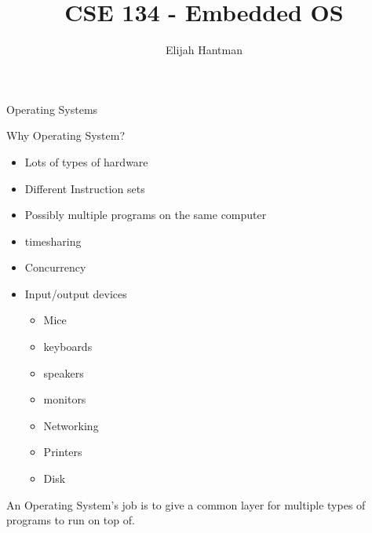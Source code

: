\documentclass{report}
\title{\Huge{CSE 134 - Embedded OS}}
\author{\huge{Elijah Hantman}}
\date{}
\begin{document}
\maketitle
\newpage

\large{Operating Systems}
\begin{description}
    \item Why Operating System? 
        \begin{mdframed}
            \begin{itemize}
                \item Lots of types of hardware
                \item Different Instruction sets
                \item Possibly multiple programs on the same computer
                \item timesharing
                \item Concurrency
                \item Input/output devices
                    \begin{itemize}
                        \item Mice
                        \item keyboards
                        \item speakers
                        \item monitors
                        \item Networking
                        \item Printers
                        \item Disk
                    \end{itemize}
            \end{itemize} 
            An Operating System's job is to give a
            common layer for multiple types of programs to
            run on top of.


\end{mdframed}
\end{description}
\end{document}
